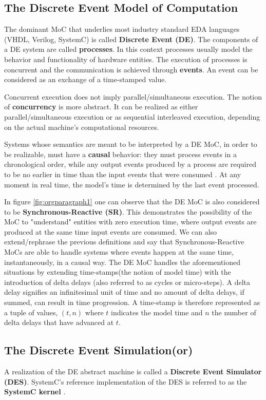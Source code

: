\documentclass[12pt,twoside]{article}
\begin{document}
\subsection{The Discrete Event Model of Computation}
\label{sec:orgheadline4}
The dominant MoC that underlies most industry standard EDA languages (VHDL, Verilog, SystemC) is called \textbf{Discrete Event (DE)}.
The components of a DE system are called \textbf{processes}.
In this context processes usually model the behavior and functionality of hardware entities.
The execution of processes is concurrent and the communication is achieved through \textbf{events}.
An event can be considered as an exchange of a time-stamped value.

Concurrent execution does not imply parallel/simultaneous execution. 
The notion of \textbf{concurrency} is more abstract. 
It can be realized as either parallel/simultaneous execution or as sequential interleaved execution, depending on the actual machine's computational resources.

Systems whose semantics are meant to be interpreted by a DE MoC, in order to be realizable, must have a \textbf{causal} behavior: they must process events in a chronological order, 
while any output events produced by a process are required to be no earlier in time than the input events that were consumed \cite{Editor2014}.
At any moment in real time, the model's time is determined by the last event processed.

In figure \ref{fig:orgparagraph1} one can observe that the DE MoC is also considered to be \textbf{Synchronous-Reactive (SR)}. 
This demonstrates the possibility of the MoC to "understand" entities with zero execution time, where output events are produced at the same time input events are consumed.
We can also extend/rephrase the previous definitions and say that Synchronous-Reactive MoCs are able to handle systems where events happen at the same time, instantaneously, in a causal way.
The DE MoC handles the aforementioned situations by extending time-stamps(the notion of model time) with the introduction of delta delays (also referred to as cycles or micro-steps).
A delta delay signifies an infinitesimal unit of time and no amount of delta delays, if summed, can result in time progression.
A time-stamp is therefore represented as a tuple of values, \((t,n)\) where \(t\) indicates the model time and \(n\) the number of delta delays that have advanced at \(t\).




\subsection{The Discrete Event Simulation(or)}
\label{sec:orgheadline5}
A realization of the DE abstract machine is called a \textbf{Discrete Event Simulator (DES)}.
SystemC's reference implementation of the DES is referred to as the \textbf{SystemC kernel} \cite{OpenSystemCInitiative2012}.
\end{document}
